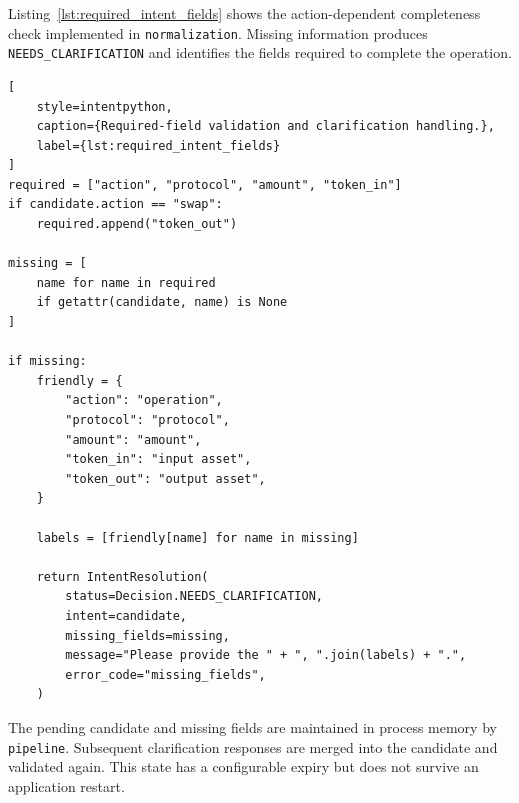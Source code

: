 Listing~\ref{lst:required_intent_fields} shows the
action-dependent completeness check implemented in
\texttt{normalization}. Missing information produces
\texttt{NEEDS\_CLARIFICATION} and identifies the fields
required to complete the operation.



\begin{lstlisting}[
    style=intentpython,
    caption={Required-field validation and clarification handling.},
    label={lst:required_intent_fields}
]
required = ["action", "protocol", "amount", "token_in"]
if candidate.action == "swap":
    required.append("token_out")

missing = [
    name for name in required
    if getattr(candidate, name) is None
]

if missing:
    friendly = {
        "action": "operation",
        "protocol": "protocol",
        "amount": "amount",
        "token_in": "input asset",
        "token_out": "output asset",
    }

    labels = [friendly[name] for name in missing]

    return IntentResolution(
        status=Decision.NEEDS_CLARIFICATION,
        intent=candidate,
        missing_fields=missing,
        message="Please provide the " + ", ".join(labels) + ".",
        error_code="missing_fields",
    )
\end{lstlisting}


The pending candidate and missing fields are maintained
in process memory by \texttt{pipeline}.
Subsequent clarification responses are merged into the
candidate and validated again. This state has a configurable
expiry but does not survive an application restart.

